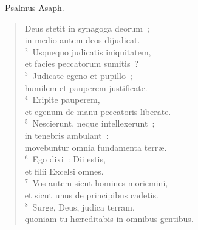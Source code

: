 ~\lettrine[lines=10,image=true,loversize=0.05,lraise=-0.03]{P}{}salmus Asaph. \begin{flushleft}\begin{verse}\vspace{6pt}Deus stetit in synagoga deorum~;\\ in medio autem deos dijudicat.\\
${}^{2}$~Usquequo judicatis iniquitatem,\\ et facies peccatorum sumitis~?\\
${}^{3}$~Judicate egeno et pupillo~;\\ humilem et pauperem justificate.\\
${}^{4}$~Eripite pauperem,\\ et egenum de manu peccatoris liberate.\\
${}^{5}$~Nescierunt, neque intellexerunt~;\\ in tenebris ambulant~:\\ movebuntur omnia fundamenta terr\ae .\\
${}^{6}$~Ego dixi~: Dii estis,\\ et filii Excelsi omnes.\\
${}^{7}$~Vos autem sicut homines moriemini,\\ et sicut unus de principibus cadetis.\\
${}^{8}$~Surge, Deus, judica terram,\\ quoniam tu h\ae reditabis in omnibus gentibus.\end{verse}\end{flushleft}


